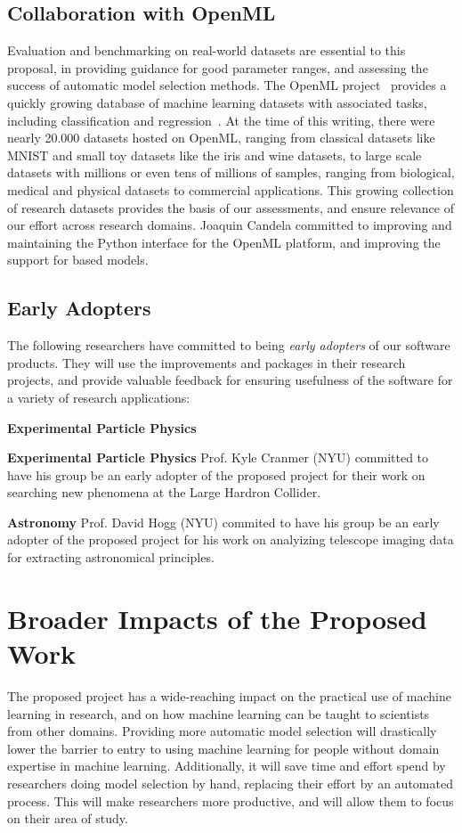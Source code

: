 \subsection{Collaboration with OpenML}
Evaluation and benchmarking on real-world datasets are essential to this
proposal, in providing guidance for good parameter ranges, and assessing the
success of automatic model selection methods. The OpenML
project~\autocite{van2013openml} provides a quickly growing database of machine
learning datasets with associated tasks, including classification and
regression~\autocite{vanschoren2014openml}. At the time of this writing, there
were nearly 20.000 datasets hosted on OpenML, ranging from classical datasets
like MNIST and small toy datasets like the iris and wine datasets, to large
scale datasets with millions or even tens of millions of samples, ranging from
biological, medical and physical datasets to commercial applications. This
growing collection of research datasets provides the basis of our assessments,
and ensure relevance of our effort across research domains.  Joaquin Candela
committed to improving and maintaining the Python interface for the OpenML
platform, and improving the support for \sklearn{} based models.

\subsection{Early Adopters}
The following researchers have committed to being \emph{early adopters} of our
software products. They will use the improvements and packages in their
research projects, and provide valuable feedback for ensuring usefulness of the
software for a variety of research applications:

\begin{labeling}{\textbf{Experimental Particle Physics}}
    \item[\textbf{Experimental Particle Physics}] Prof. Kyle Cranmer (NYU) committed to have his group be an early
    adopter of the proposed project for their work on searching new phenomena at the Large Hardron Collider.
    \item[\textbf{Astronomy}] Prof. David Hogg (NYU) commited to have his group be an
        early adopter of the proposed project for his work on analyizing
        telescope imaging data for extracting astronomical principles.
\end{labeling}

\section{Broader Impacts of the Proposed Work}
The proposed project has a wide-reaching impact on the practical use of
machine learning in research, and on how machine learning can be taught to
 scientists from other domains.
Providing more automatic model selection will drastically lower the barrier
to entry to using machine learning for people without domain expertise
in machine learning.
Additionally, it will save time and effort spend by researchers doing
model selection by hand, replacing their effort by an automated process.
This will make researchers more productive, and will allow them to focus
on their area of study.

